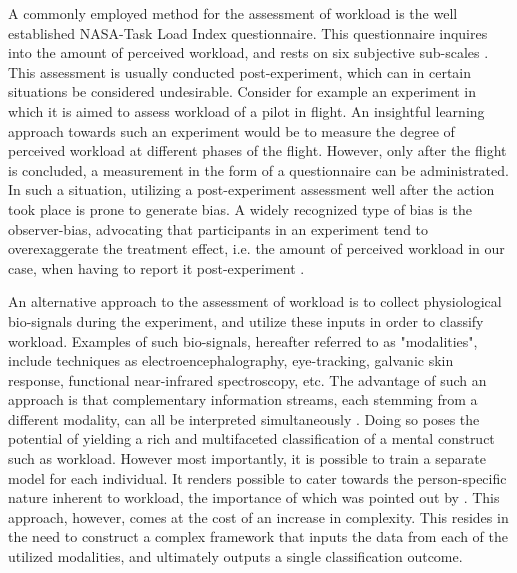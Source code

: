 \documentclass[12pt]{article}
\begin{document}
A commonly employed method for the assessment of workload is the well established NASA-Task Load Index questionnaire. This questionnaire inquires into the amount of perceived workload, and rests on six subjective sub-scales \cite{hart2006nasa}. This assessment is usually conducted post-experiment, which can in certain situations be considered undesirable. Consider for example an experiment in which it is aimed to assess workload of a pilot in flight. An insightful learning approach towards such an experiment would be to measure the degree of perceived workload at different phases of the flight. However, only after the flight is concluded, a measurement in the form of a questionnaire can be administrated. In such a situation, utilizing a post-experiment assessment well after the action took place is prone to generate bias. A widely recognized type of bias is the observer-bias, advocating that participants in an experiment tend to overexaggerate the treatment effect, i.e. the amount of perceived workload in our case, when having to report it post-experiment \cite{mahtani2018catalogue}.

An alternative approach to the assessment of workload is to collect physiological bio-signals during the experiment, and utilize these inputs in order to classify workload. Examples of such bio-signals, hereafter referred to as "modalities", include techniques as electroencephalography, eye-tracking, galvanic skin response, functional near-infrared spectroscopy, etc. The advantage of such an approach is that complementary information streams, each stemming from a different modality, can all be interpreted simultaneously \cite{ramachandram2017deep}. Doing so poses the potential of yielding a rich and multifaceted classification of a mental construct such as workload. However most importantly, it is possible to train a separate model for each individual. It renders possible to cater towards the person-specific nature inherent to workload, the importance of which was pointed out by . This approach, however, comes at the cost of an increase in complexity. This resides in the need to construct a complex framework that inputs the data from each of the utilized modalities, and ultimately outputs a single classification outcome. 
\end{document}

